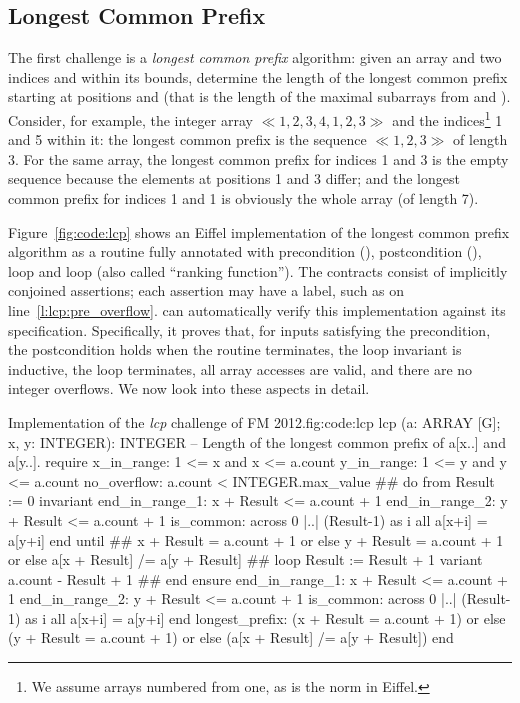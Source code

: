 \subsection{Longest Common Prefix} \label{sec:eval-challenges:lcp}

The first challenge is a \emph{longest common prefix} algorithm: given an array  and two indices  and  within its bounds, determine the length of the longest common prefix starting at positions  and  (that is the length of the maximal subarrays from  and ). 
Consider, for example, the integer array $\ll 1, 2, 3, 4, 1, 2, 3 \gg$ and the indices\footnote{We assume arrays numbered from one, as is the norm in Eiffel.} 1 and 5 within it: the longest common prefix is the sequence $\ll 1, 2, 3 \gg$ of length 3. 
For the same array, the longest common prefix for indices 1 and 3 is the empty sequence because the elements at positions 1 and 3 differ; and the longest common prefix for indices 1 and 1 is obviously the whole array (of length 7).

Figure~\ref{fig:code:lcp} shows an Eiffel implementation of the longest common prefix algorithm as a routine  fully annotated with precondition (), postcondition (), loop  and loop  (also called ``ranking function'').
The contracts consist of implicitly conjoined assertions; each assertion may have a label, such as  on line~\ref{l:lcp:pre_overflow}.
\AutoProof can automatically verify this implementation against its specification.
Specifically, it proves that, for inputs satisfying the precondition, the postcondition holds when the routine terminates, the loop invariant is inductive, the loop terminates, all array accesses are valid, and there are no integer overflows. 
We now look into these aspects in detail.

\begin{efigure}[!ht]{Implementation of the \emph{lcp} challenge of FM 2012.}{fig:code:lcp}
lcp (a: ARRAY [G]; x, y: INTEGER): INTEGER
		-- Length of the longest common prefix of a[x..] and a[y..].
	require
		x_in_range: 1 <= x and x <= a.count
		y_in_range: 1 <= y and y <= a.count
		no_overflow: a.count < {INTEGER}.max_value #\label{l:lcp:pre_overflow}#
	do
		from Result := 0
		invariant
			end_in_range_1: x + Result <= a.count + 1
			end_in_range_2: y + Result <= a.count + 1
			is_common: across 0 |..| (Result-1) as i all a[x+i] = a[y+i] end
		until #\label{l:lcp:until_start}#
			x + Result = a.count + 1 or else
			y + Result = a.count + 1 or else
			a[x + Result] /= a[y + Result] #\label{l:lcp:until_end}#
		loop Result := Result + 1
		variant a.count - Result + 1 #\label{l:lcp:variant}#
		end
	ensure
		end_in_range_1: x + Result <= a.count + 1
		end_in_range_2: y + Result <= a.count + 1
		is_common: across 0 |..| (Result-1) as i all a[x+i] = a[y+i] end
		longest_prefix: (x + Result = a.count + 1) or else
						(y + Result = a.count + 1) or else
						(a[x + Result] /= a[y + Result])
	end
\end{efigure}


